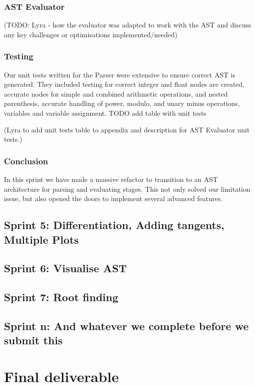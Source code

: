 \documentclass[a4paper, oneside, 11pt]{report}
\begin{document}
\subsection{AST Evaluator}
(TODO: Lyra - how the evaluator was adapted to work with the AST and discuss any key challenges or optimisations implemented/needed)

\subsection{Testing}
Our unit tests written for the Parser were extensive to ensure correct AST is generated. They included testing for
correct integer and float nodes are created, 
accurate nodes for simple and combined arithmetic operations, and nested parenthesis,
accurate handling of power, modulo, and unary minus operations, 
variables and variable assignment. 
TODO add table with unit tests

(Lyra to add unit tests table to appendix and description for AST Evaluator unit tests.)

\subsection{Conclusion}
In this sprint we have made a massive refactor to transition to an AST architecture for parsing and evaluating stages. This not only solved our limitation issue, but also opened the doors to implement several advanced features.


\section{Sprint 5: Differentiation, Adding tangents, Multiple Plots}
\section{Sprint 6: Visualise AST}
\section{Sprint 7: Root finding}
\section{Sprint n: And whatever we complete before we submit this}



\chapter{Final deliverable}\label{Impl}
\end{document}
